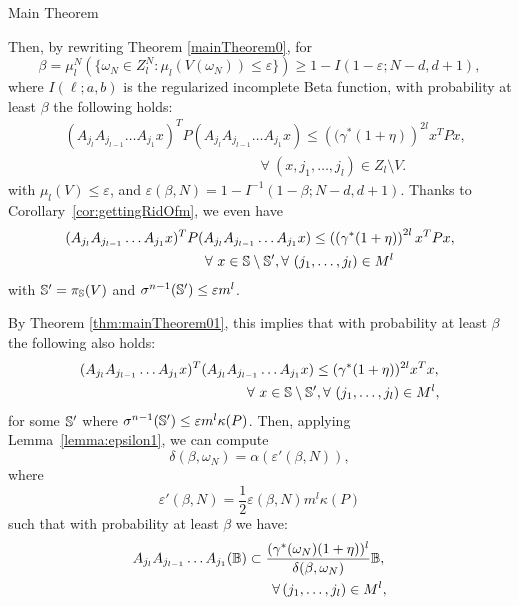 \begin{subsection}{Main Theorem}
\begin{pf}
Then, by rewriting Theorem \ref{mainTheorem0}, for
\begin{equation}\label{eqn:violation2}
\beta = \mu_l^N \left( \{ \omega_N \in Z_l^N: \mu_l(V(\omega_N)) \leq \varepsilon \} \right) \geq 1- I(1-\varepsilon; N-d, d+1),
\end{equation}
where $I(\ell;a,b)$ is the regularized incomplete Beta function, with probability at least $\beta$ the following holds:
\begin{equation*} 
\begin{aligned}
& (A_{j_l} A_{j_{l-1}} \dots A_{j_1} x)^T P (A_{j_l} A_{j_{l-1}} \dots A_{j_1} x) \leq  \left((\gamma^{*}(1+\eta) \right)^{2l} x^T P x, \\
& \qquad \qquad \qquad \qquad \qquad \qquad \qquad \forall\ (x, j_1, \dots, j_l) \in Z_l \setminus V.
\end{aligned}
\end{equation*}
with $\mu_l(V) \leq \varepsilon$, and $\varepsilon(\beta, N)=1- I^{-1}(1-\beta; N-d, d+1)$. Thanks to Corollary~\ref{cor:gettingRidOfm}, we even have
\begin{equation*} 
\begin{aligned}
& (A_{j_l} A_{j_{l-1}} \dots A_{j_1} x)^T P (A_{j_l} A_{j_{l-1}} \dots A_{j_1} x) \leq  \left((\gamma^{*}(1+\eta) \right)^{2l} x^T P x, \\
& \qquad \qquad \qquad \qquad \qquad \forall\ x \in \mathbb{S} \setminus \mathbb{S}', \forall\ (j_1, \dots, j_l) \in M^l
\end{aligned}
\end{equation*}
with $\mathbb{S}' = \pi_{\mathbb{S}}(V)$ and $\sigma^{n-1}(\mathbb{S}') \leq \varepsilon m^l$.

By Theorem \ref{thm:mainTheorem01}, this implies that with probability at least $\beta$ the following also holds:
\begin{equation}
\begin{aligned}
& (A_{j_l} A_{j_{l-1}} \dots A_{j_1} x)^T (A_{j_l} A_{j_{l-1}} \dots A_{j_1} x) \leq ( \gamma^{*}(1+\eta) )^{2l} x^T x, \\
& \qquad \qquad \qquad \qquad \qquad \qquad  \forall\ x \in \mathbb{S} \setminus \mathbb{S}', \forall\ (j_1,\dots,j_l) \in M^l,
\end{aligned}
\end{equation}
for some $\mathbb{S}'$ where $\sigma^{n-1}(\mathbb{S}') \leq \varepsilon m^l \kappa(P)$. Then, applying Lemma~\ref{lemma:epsilon1}, we can compute
$$\delta(\beta, \omega_N) =\alpha(\varepsilon'(\beta,N)),$$
where
\begin{equation}\label{eqn:eps2}
\varepsilon'(\beta, N) = \frac{1}{2} \varepsilon(\beta,N) m^l \kappa(P) 
\end{equation} 
such that with probability at least $\beta$ we have:
\begin{equation*}
\begin{aligned}
& A_{j_l} A_{j_{l-1}} \dots A_{j_1} (\mathbb{B}) \subset \frac{(\gamma^{*}(\omega_N)(1+\eta))^l}{\delta(\beta, \omega_N)}\mathbb{B}, \\
& \qquad \qquad \qquad \qquad \qquad \forall\, (j_1,\dots,j_l) \in M^l,
\end{aligned}
\end{equation*}


\end{pf}
\end{subsection}

